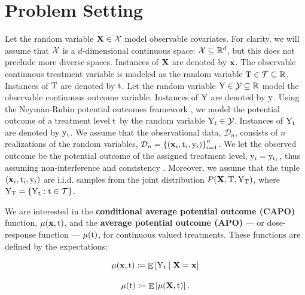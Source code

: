 \section{Problem Setting}
Let the random variable $\mathbf{X} \in \mathcal{X}$ model observable covariates.
For clarity, we will assume that $\mathcal{X}$ is a $d$-dimensional continuous space: $\mathcal{X} \subseteq \mathbb{R}^d$, but this does not preclude more diverse spaces.
Instances of $\mathbf{X}$ are denoted by $\mathbf{x}$.
The observable continuous treatment variable is modeled as the random variable $\mathrm{T} \in \mathcal{T} \subseteq \mathbb{R}$.
Instances of $\mathrm{T}$ are denoted by $\mathrm{t}$.
Let the random variable $\mathrm{Y} \in \mathcal{Y} \subseteq \mathbb{R}$ model the observable continuous outcome variable.
Instances of $\mathrm{Y}$ are denoted by $\mathrm{y}$.
Using the Neyman-Rubin potential outcomes framework \citep{neyman1923edited, rubin1974estimating, sekhon2008neyman}, we model the potential outcome of a treatment level $\mathrm{t}$ by the random variable $\mathrm{Y}_{\mathrm{t}} \in \mathcal{Y}$.
Instances of $\mathrm{Y}_{\mathrm{t}}$ are denoted by $\mathrm{y}_{\mathrm{t}}$.
We assume that the observational data, $\mathcal{D}_n$, consists of $n$ realizations of the random variables, $\mathcal{D}_n = \left\{ (\mathbf{x}_i, \mathrm{t}_i, \mathrm{y}_i) \right\}_{i=1}^{n}$.
We let the observed outcome be the potential outcome of the assigned treatment level, $\mathrm{y}_i = \mathrm{y}_{\mathrm{t}_i}$, thus assuming non-interference and consistency \citep{rubin1980randomization}.
Moreover, we assume that the tuple $(\mathbf{x}_i, \mathrm{t}_i, \mathrm{y}_i)$ are i.i.d. samples from the joint distribution $P(\mathbf{X}, \mathrm{T}, \mathrm{Y}_{\mathrm{T}})$, where $\mathrm{Y}_{\mathrm{T}} = \{\mathrm{Y}_{\mathrm{t}}: \mathrm{t} \in \mathcal{T}\}$.

We are interested in the \textbf{conditional average potential outcome (CAPO)} function, $\mu(\mathbf{x}, \mathrm{t})$, and the \textbf{average potential outcome (APO)} — or dose-response function — $\mu(\mathrm{t})$, for continuous valued treatments.
These functions are defined by the expectations:
\begin{minipage}{.5\linewidth}
    \begin{equation}
        \label{eq:CAPO}
        \mu(\mathbf{x}, \mathrm{t}) \coloneqq \mathop{\mathbb{E}}\left[ \mathrm{Y}_{\mathrm{t}} \mid \mathbf{X} = \mathbf{x} \right]
    \end{equation}
\end{minipage}%
\begin{minipage}{.5\linewidth}
    \begin{equation}
        \label{eq:APO}
        \mu(\mathrm{t}) \coloneqq \mathop{\mathbb{E}}\left[ \mu(\mathbf{X}, \mathrm{t}) \right].
    \end{equation}
\end{minipage}

